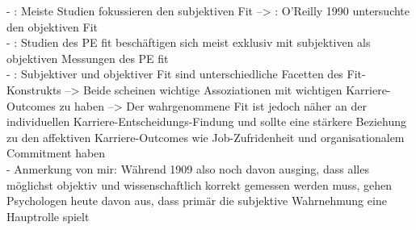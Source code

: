 - \cite[S. 9]{caplan:1993}: Meiste Studien fokussieren den subjektiven Fit --> \cite[S. 10]{caplan:1993}: O'Reilly 1990 untersuchte den objektiven Fit\\
- \cite[S. 8]{caplan:1987}: Studien des PE fit beschäftigen sich meist exklusiv mit subjektiven als objektiven Messungen des PE fit\\
- \cite[S. 8f.]{su:2015}: Subjektiver und objektiver Fit sind unterschiedliche Facetten des Fit-Konstrukts --> Beide scheinen wichtige Assoziationen mit wichtigen Karriere-Outcomes zu haben --> Der wahrgenommene Fit ist jedoch näher an der individuellen Karriere-Entscheidungs-Findung und sollte eine stärkere Beziehung zu den affektiven Karriere-Outcomes wie Job-Zufridenheit und organisationalem Commitment haben \\
- Anmerkung von mir: Während \textcite{parsons:1909} 1909 also noch davon ausging, dass alles möglichst objektiv und wissenschaftlich korrekt gemessen werden muss, gehen Psychologen heute davon aus, dass primär die subjektive Wahrnehmung eine Hauptrolle spielt \\

